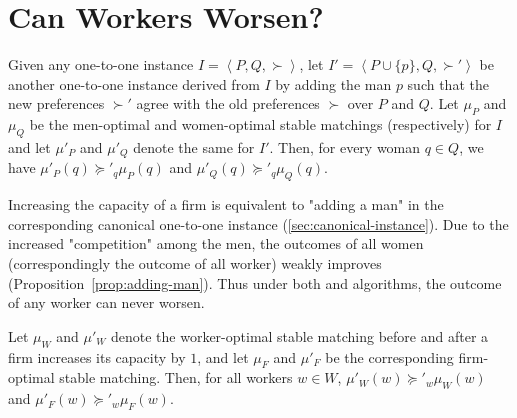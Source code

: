 \section{Can Workers Worsen?}

\begin{proposition}
  \label{prop:adding-man}
  Given any one-to-one instance $I = \left< P, Q, \succ \right>$, let $I' = \left< P \cup \{p\}, Q, \succ' \right>$ be another one-to-one instance derived from $I$ by adding the man $p$ such that the new preferences $\succ'$ agree with the old preferences $\succ$ over $P$ and $Q$. Let $\mu_P$ and $\mu_Q$ be the men-optimal and women-optimal stable matchings (respectively) for $I$ and let $\mu'_P$ and $\mu'_Q$ denote the same for $I'$. Then, for every woman $q \in Q$, we have $\mu'_P(q) \succeq'_q \mu_P(q)$ and $\mu'_Q(q) \succeq'_q \mu_Q(q)$.
\end{proposition}

Increasing the capacity of a firm is equivalent to "adding a man" in the corresponding canonical one-to-one instance (\autoref{sec:canonical-instance}). Due to the increased "competition" among the men, the outcomes of all women (correspondingly the outcome of all worker) weakly improves (Proposition~\ref{prop:adding-man}). Thus under both \WPDA and \FPDA algorithms, the outcome of any worker can never worsen.

\begin{corollary}
  \label{coro:workers-never-worsen}
  Let $\mu_W$ and $\mu'_W$ denote the worker-optimal stable matching before and after a firm increases its capacity by $1$, and let $\mu_F$ and $\mu'_F$ be the corresponding firm-optimal stable matching. Then, for all workers $w \in W$, $\mu'_W(w) \succeq'_w \mu_W(w)$ and $\mu'_F(w) \succeq'_w \mu_F(w)$.
\end{corollary}